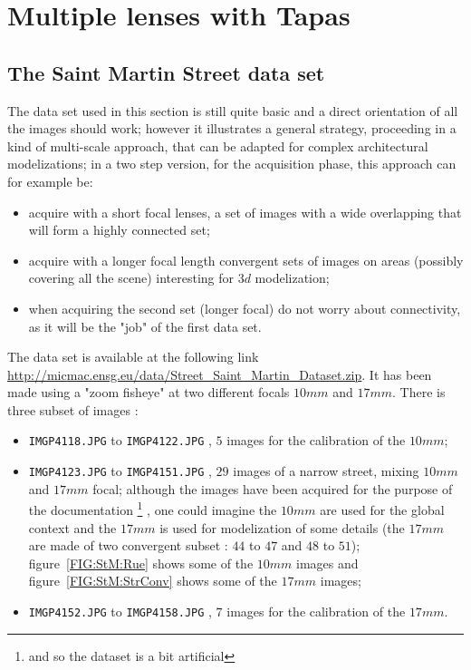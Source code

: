 
\section{Multiple lenses with Tapas}

\subsection{The Saint Martin Street data set}

The data set used in this section is still quite  basic
and a direct orientation of all the images should work; however it
illustrates a general strategy, proceeding in a kind of multi-scale approach,
that can be adapted for complex architectural modelizations;
in a two step version, for the acquisition phase, this approach
can for example be:

\begin{itemize}
   \item acquire with a short focal lenses, a set of images with a wide
	 overlapping that will form a highly connected set;

   \item acquire with a longer focal length convergent sets of images on
	  areas (possibly covering all the scene) interesting for $3d$ modelization;

   \item when acquiring the second set (longer focal) do not worry about
	 connectivity, as it will be the "job" of the first data set.
\end{itemize}

The data set is available at the following link \url{http://micmac.ensg.eu/data/Street_Saint_Martin_Dataset.zip}.
It has been made using a "zoom fisheye" at two different focals $10mm$ and $17mm$.
There is three subset of images :

\begin{itemize}
    \item {\tt IMGP4118.JPG} to {\tt IMGP4122.JPG} , $5$ images for the calibration
	  of the $10mm$;
    \item {\tt IMGP4123.JPG} to {\tt IMGP4151.JPG} , $29$ images of a narrow street,
	  mixing $10mm$ and $17mm$ focal; although the images have been acquired for
	  the purpose of the documentation \footnote{and  so the dataset is a bit artificial}
	 , one could imagine the $10mm$ are used for the global context and the $17mm$ is used for
	  modelization of some details (the $17mm$ are made of two convergent subset :
	  $44$ to $47$ and $48$ to $51$);  figure~\ref{FIG:StM:Rue} shows some
	  of the $10mm$ images and figure~\ref{FIG:StM:StrConv} shows some of the $17mm$ images;

    \item {\tt IMGP4152.JPG} to {\tt IMGP4158.JPG} , $7$ images for the calibration of
	  the $17mm$.

\end{itemize}

